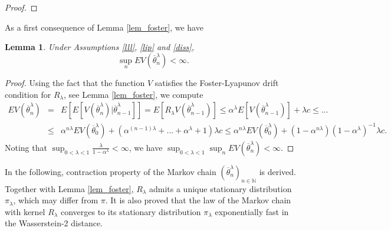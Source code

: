 \documentclass[a4paper]{article}
\newtheorem{lemma}[theorem]{Lemma}
\def\e{\text{e}}
\def\Rd{\mathbb{R}^{d}}
\def\1{\mathds{1}}
\begin{document}
\begin{proof}
\end{proof}

As a first consequence of Lemma \ref{lem_foster}, we have
\begin{lemma}\label{lavel} Under Assumptions \ref{lll}, \ref{lip} and \ref{diss},
$$
\sup_n EV(\overline{\theta}^{\lambda}_n)<\infty.
$$
\end{lemma}
\begin{proof}
Using the fact that the function $V$ satisfies the Foster-Lyapunov drift condition for $R_{\lambda}$, see Lemma \ref{lem_foster}, we compute
\begin{eqnarray*}
EV(\overline{\theta}^{\lambda}_n) &=& E\left[ E[V(\overline{\theta}^{\lambda}_n) | \overline{\theta}^{\lambda}_{n-1} ] \right] =
E\left[ R_{\lambda} V(\overline{\theta}^{\lambda}_{n-1})  \right]\leq \alpha^{\lambda}E[V(\overline{\theta}^{\lambda}_{n-1}) ] + \lambda c \le\ldots \\
&\le& \alpha^{n \lambda} EV(\overline{\theta}^{\lambda}_0) + (\alpha^{(n-1)\lambda} + \ldots + \alpha^{\lambda}+1) \lambda c \le  \alpha^{n \lambda} EV(\overline{\theta}^{\lambda}_0) + (1-\alpha^{n\lambda})(1-\alpha^{\lambda})^{-1} \lambda c.
\end{eqnarray*}
Noting that $\sup_{ 0 < \lambda < 1}\frac{\lambda}{1-\alpha ^{\lambda}} < \infty$, we have
$\sup_{0<\lambda<1}\sup_n EV(\overline{\theta}^{\lambda}_n)<\infty$.
\end{proof}

In the following, contraction property
of the Markov chain $(\overline{\theta}^{\lambda}_n)_{n\in\mathbb{N}}$ is derived. Together with Lemma \ref{lem_foster}, $R_{\lambda}$ admits a unique stationary distribution $\pi_{\lambda}$, which may differ from $\pi$. It is also proved that the law of the Markov chain with kernel $R_{\lambda}$ converges to its stationary distribution $\pi_{\lambda}$ exponentially fast in the Wasserstein-2 distance.
\end{document}
